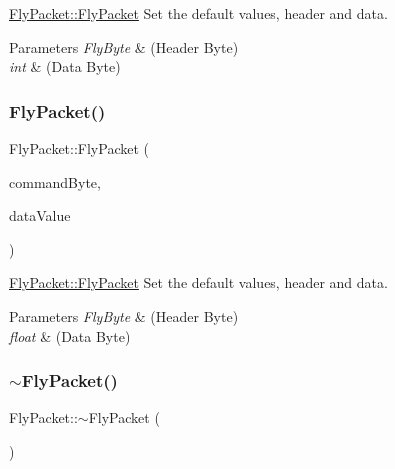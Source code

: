 \hyperlink{class_fly_packet_aca19954f7e01d839b5759245a9950d57}{Fly\+Packet\+::\+Fly\+Packet} Set the default values, header and data. 


\begin{DoxyParams}{Parameters}
{\em Fly\+Byte} & (Header Byte) \\
\hline
{\em int} & (Data Byte) \\
\hline
\end{DoxyParams}
\hypertarget{class_fly_packet_a24c7957a841f24405f26ceb918e15a04}{}\label{class_fly_packet_a24c7957a841f24405f26ceb918e15a04} 
\subsubsection{\texorpdfstring{Fly\+Packet()}{FlyPacket()}\hspace{0.1cm}{\footnotesize\ttfamily [3/3]}}
{\footnotesize\ttfamily Fly\+Packet\+::\+Fly\+Packet (\begin{DoxyParamCaption}\item[{\hyperlink{conversions_8h_a1f006e31a957accfe6aa1bf6f401efce}{Fly\+Byte}}]{command\+Byte,  }\item[{float}]{data\+Value }\end{DoxyParamCaption})}



\hyperlink{class_fly_packet_aca19954f7e01d839b5759245a9950d57}{Fly\+Packet\+::\+Fly\+Packet} Set the default values, header and data. 


\begin{DoxyParams}{Parameters}
{\em Fly\+Byte} & (Header Byte) \\
\hline
{\em float} & (Data Byte) \\
\hline
\end{DoxyParams}
\hypertarget{class_fly_packet_a58a219b0a59c413237eea53dc6231fcf}{}\label{class_fly_packet_a58a219b0a59c413237eea53dc6231fcf} 
\subsubsection{\texorpdfstring{$\sim$\+Fly\+Packet()}{~FlyPacket()}}
{\footnotesize\ttfamily Fly\+Packet\+::$\sim$\+Fly\+Packet (\begin{DoxyParamCaption}{ }\end{DoxyParamCaption})}



